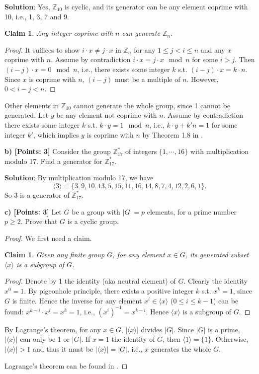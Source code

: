 \documentclass[12pt]{article}
\newcommand{\Z}{\mathbb{Z}}
\newcommand{\angles}[1]{\langle #1 \rangle}
\newtheorem{claim}[theorem]{Claim}
\theoremstyle{definition}
\begin{document}
{\bf Solution}: Yes, $\Z_{10}$ is cyclic, and its generator can be any element coprime with 10, i.e., 1, 3, 7 and 9. 
\begin{claim}
Any integer coprime with $n$ can generate $\Z_n$.
\end{claim}
\begin{proof}
It suffices to show $i\cdot x \not= j \cdot x$ in $\Z_n$ for any $1\leq j < i \leq n$ and any $x$ coprime with $n$. Assume by contradiction $i\cdot x = j \cdot x \mod n$ for some $i > j$. Then $(i-j)\cdot x =0 \mod n$, i.e., there exists some integer $k$ s.t. $(i-j)\cdot x = k\cdot n$. Since $x$ is coprime with $n$, $(i-j)$ must be a multiple of $n$. However, $0 < i-j < n$.
\end{proof}
Other elements in $\Z_{10}$ cannot generate the whole group, since 1 cannot be generated. Let $y$ be any element not coprime with $n$. Assume by contradiction there exists some integer $k$ s.t. $k\cdot y = 1 \mod n$, i.e., $k\cdot y + k' n = 1$ for some integer $k'$, which implies $y$ is coprime with $n$ by Theorem 1.8 in \cite{Shoup09}.

{\bf b) [Points: 3]} Consider the group $\Z_{17}^*$ of integers $\{1, \cdots, 16\}$ with multiplication modulo 17. Find a generator for $\Z_{17}^*$.

{\bf Solution}: By multiplication modulo 17, we have 
$$\angles{3} = \{3, 9, 10, 13, 5, 15, 11, 16, 14, 8, 7, 4, 12, 2, 6, 1\}.$$
So 3 is a generator of $\Z_{17}^*$.

{\bf c) [Points: 3]} Let $G$ be a group with $|G| = p$ elements, for a prime number $p\geq 2$. Prove that $G$ is a cyclic group.
\begin{proof}
We first need a claim.
\begin{claim}
Given any finite group $G$, for any element $x\in G$, its generated subset $\angles{x}$ is a subgroup of $G$.
\end{claim}
\begin{proof}
Denote by 1 the identity (aka neutral element) of $G$. Clearly the identity $x^0 = 1$. By pigeonhole principle, there exists a positive integer $k$ s.t. $x^k = 1$, since $G$ is finite. Hence the inverse for any element $x^i \in \angles{x}$ ($0\leq i \leq k-1$) can be found: $x^{k-i} \cdot x^i = x^{k} = 1$, i.e., $(x^i)^{-1} = x^{k-i}$. Hence $\angles{x}$ is a subgroup of $G$.
\end{proof}
By Lagrange's theorem, for any $x\in G$, $|\angles{x}|$ divides $|G|$. Since $|G|$ is a prime, $|\angles{x}|$ can only be 1 or $|G|$. If $x=1$ the identity of $G$, then $\angles{1} = \{1\}$. Otherwise, $|\angles{x}|>1$ and thus it must be $|\angles{x}| = |G|$, i.e., $x$ generates the whole $G$.

Lagrange's theorem can be found in \cite{Shoup09}.
\end{proof}
\end{document}
